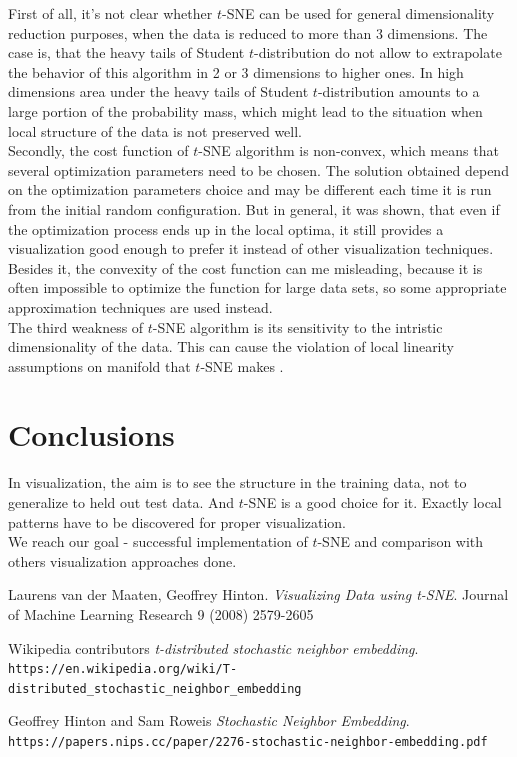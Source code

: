First of all, it's not clear whether $t$-SNE can be used for general dimensionality reduction purposes, when the data is reduced to more than 3 dimensions. The case is, that the heavy tails of Student $t$-distribution do not allow to extrapolate the behavior of this algorithm in 2 or 3 dimensions to higher ones. In high dimensions area under the heavy tails of Student $t$-distribution amounts to a large portion of the probability mass, which might lead to the situation when local structure of the data is not preserved well. \\

Secondly, the cost function of $t$-SNE algorithm is non-convex, which means that several optimization parameters need to be chosen. The solution obtained depend on the optimization parameters choice and may be different each time it is run from the initial random configuration. But in general, it was shown, that even if the optimization process ends up in the local optima, it still provides a visualization good enough to prefer it instead of other visualization techniques. Besides it, the convexity of the cost function can me misleading, because it is often impossible to optimize the function for large data sets, so some appropriate approximation techniques are used instead. \\

The third weakness of $t$-SNE algorithm is its sensitivity to the intristic dimensionality of the data. This can cause the violation of local linearity assumptions on manifold that $t$-SNE makes \cite{tsnearticle}.

\section{Conclusions}

In visualization, the aim is to see the structure in the training
data, not to generalize to held out test data. And $t$-SNE is a good choice for it. Exactly local patterns have to be discovered for proper visualization.\\
We reach our goal - successful implementation of $t$-SNE and comparison with others visualization approaches done.

\begin{thebibliography}{4}
	Laurens van der Maaten, Geoffrey Hinton.
	\textit{Visualizing Data using t-SNE}. 
	Journal of Machine Learning Research 9 (2008) 2579-2605
	
	Wikipedia contributors
	\textit{t-distributed stochastic neighbor embedding}. 
	\\\texttt{https://en.wikipedia.org/wiki/T-distributed\_stochastic\_neighbor\_embedding}
	
	Geoffrey Hinton and Sam Roweis
	\textit{Stochastic Neighbor Embedding}.
	\texttt{https://papers.nips.cc/paper/2276-stochastic-neighbor-embedding.pdf}
	
	
\end{thebibliography}



